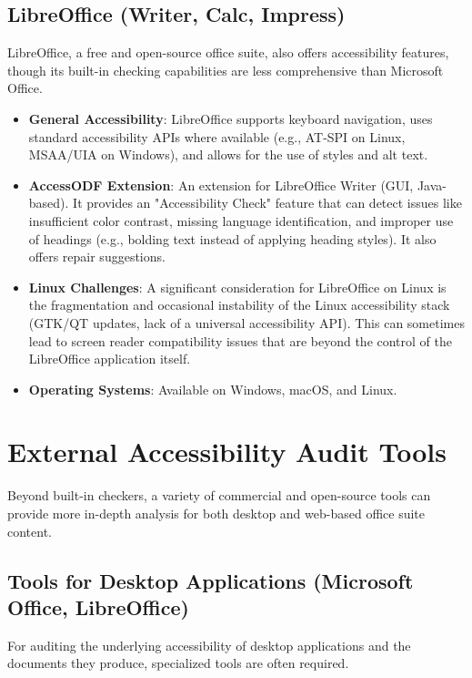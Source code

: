 \subsection{LibreOffice (Writer, Calc, Impress)}
LibreOffice, a free and open-source office suite, also offers accessibility features, though its built-in checking capabilities are less comprehensive than Microsoft Office.
\begin{itemize}
    \item \textbf{General Accessibility}: LibreOffice supports keyboard navigation\cite{LibreOfficeKeyboard}, uses standard accessibility APIs where available (e.g., AT-SPI on Linux, MSAA/UIA on Windows), and allows for the use of styles and alt text.
    \item \textbf{AccessODF Extension}\cite{AccessODF}: An extension for LibreOffice Writer (GUI, Java-based). It provides an "Accessibility Check" feature that can detect issues like insufficient color contrast, missing language identification, and improper use of headings (e.g., bolding text instead of applying heading styles). It also offers repair suggestions.
    \item \textbf{Linux Challenges}: A significant consideration for LibreOffice on Linux is the fragmentation and occasional instability of the Linux accessibility stack (GTK/QT updates, lack of a universal accessibility API). This can sometimes lead to screen reader compatibility issues that are beyond the control of the LibreOffice application itself.
    \item \textbf{Operating Systems}: Available on Windows, macOS, and Linux.
\end{itemize}

\section{External Accessibility Audit Tools}
\label{sec:office-external-tools}

Beyond built-in checkers, a variety of commercial and open-source tools can provide more in-depth analysis for both desktop and web-based office suite content.

\subsection{Tools for Desktop Applications (Microsoft Office, LibreOffice)}

For auditing the underlying accessibility of desktop applications and the documents they produce, specialized tools are often required.

